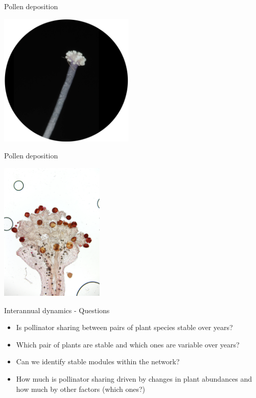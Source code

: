 \documentclass[
  ignorenonframetext,
  aspectratio=169,
]{beamer}
\begin{document}
\begin{frame}{}
\begin{block}{Pollen deposition}
\label{pollen-deposition}
\begin{center}
\includegraphics[width=2.53125in,height=\textheight,keepaspectratio]{images/stigma.png}
\end{center}
\end{block}

\begin{block}{Pollen deposition}
\label{pollen-deposition-1}
\begin{center}
\includegraphics[width=1.94792in,height=\textheight,keepaspectratio]{images/Blizna_Suc_pra_2.jpg}
\end{center}
\end{block}

\begin{block}{Interannual dynamics - Questions}
\label{interannual-dynamics---questions}
\begin{itemize}
\item
  Is pollinator sharing between pairs of plant species stable over
  years?
\item
  Which pair of plants are stable and which ones are variable over
  years?
\item
  Can we identify stable modules within the network?
\item
  How much is pollinator sharing driven by changes in plant abundances
  and how much by other factors (which ones?)
\end{itemize}
\end{block}


\end{frame}
\end{document}
